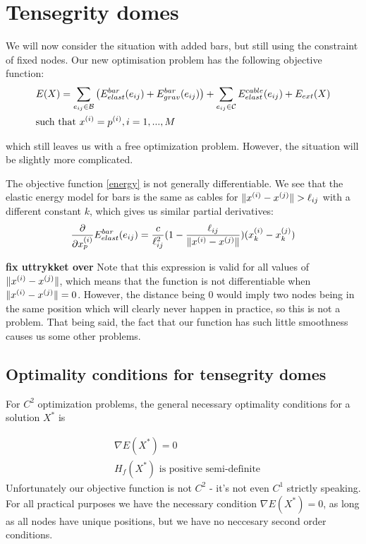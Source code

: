 \section{Tensegrity domes}
We will now consider the situation with added bars, but still using the constraint of fixed nodes. Our new optimisation problem has the following objective function:
\begin{equation}
\begin{aligned}
    \label{energy}
    &E(X) = \sum\limits_{e_{ij} \in \mathcal{B}}\big(E^{bar}_{elast}(e_{ij}) + E^{bar}_{grav}(e_{ij})\big) + \sum\limits_{e_{ij} \in \mathcal{C}} E^{cable}_{elast}(e_{ij}) + E_{ext}(X) \\
    & \text{such that } x^{(i)} = p^{(i)}, i=1,...,M
\end{aligned}
\end{equation}

which still leaves us with a free optimization problem. However, the situation will be slightly more complicated.

The objective function \eqref{energy} is not generally differentiable. We see that the elastic energy model for bars is the same as cables for $\lVert x^{(i)} - x^{(j)}\rVert > \ell_{ij}$ with a different constant $k$, which gives us similar partial derivatives:
\begin{equation*}
\frac{\partial}{\partial x_p^{(i)}} E^{bar}_{elast}(e_{ij}) = \frac{c}{\ell_{ij}^2} (1- \frac{\ell_{ij}}{\lVert x^{(i)} - x^{(j)}\rVert}) (x_k^{(i)} - x_k^{(j)})
\end{equation*}

\textbf{fix uttrykket over}
Note that this expression is valid for all values of $\lVert x^{(i)} - x^{(j)}\rVert$, which means that the function is not differentiable when $\lVert x^{(i)} - x^{(j)}\rVert = 0$. However, the distance being $0$ would imply two nodes being in the same position which will clearly never happen in practice, so this is not a problem. That being said, the fact that our function has such little smoothness causes us some other problems.

\subsection{Optimality conditions for tensegrity domes}
For $C^2$ optimization problems, the general necessary optimality conditions for a solution $X^*$ is

\begin{align*}
    &\nabla E(X^*) = 0\\
    & H_f(X^*) \text{ is positive semi-definite}
\end{align*}
Unfortunately our objective function is not $C^2$ - it's not even $C^1$ strictly speaking. For all practical purposes we have the necessary condition $\nabla E(X^*) = 0$, as long as all nodes have unique positions, but we have no neccesary second order conditions.

